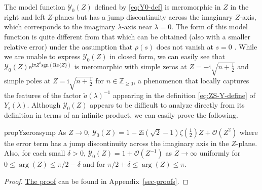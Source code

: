 \documentclass[12pt]{amsart}
\numberwithin{equation}{section}
\newcommand{\ee}{\mathrm{e}}
\newcommand{\ii}{\mathrm{i}}
\newcommand{\SP}{\lambda}
\newcommand{\bigo}[1]{ \mathcal{O}\! \left( #1 \right) }
\begin{document}
The model function $\mathcal{Y}_0(Z)$ defined by \eqref{eq:Y0-def} is meromorphic in $Z$ in the right and left $Z$-planes but has a jump discontinuity across the imaginary $Z$-axis, which corresponds to the imaginary $\SP$-axis near $\SP=0$.  The form of this model function is quite different from that which can be obtained (also with a smaller relative error) under the assumption that $\rho(s)$ does not vanish at $s=0$ \cite[Proposition 4.3]{BaikKMM07}.  While we are unable to express $\mathcal{Y}_0(Z)$ in closed form, we can easily see that 
$\mathcal{Y}_0(Z)\ee^{\ii\pi Z^2\mathrm{sgn}(\mathrm{Re}\{Z\})}$ is meromorphic with simple zeros at $Z=-\ii\sqrt{n+\frac{1}{2}}$ and simple poles at $Z=\ii\sqrt{n+\frac{1}{2}}$ for $n\in\mathbb{Z}_{\ge 0}$, a phenomenon that locally captures the features of the factor $\widetilde{a}(\SP)^{-1}$ appearing in the definition \eqref{eq:ZS-Y-define} of $Y_\epsilon(\SP)$.  Although $\mathcal{Y}_0(Z)$ appears to be difficult to analyze directly from its definition in terms of an infinite product, we can easily prove the following.
\begin{restatable}{prop}{Yzeroasymp}
As $Z\to 0$, $\mathcal{Y}_0(Z)=1-2\ii (\sqrt{2}-1)\zeta(\frac{1}{2})Z +\bigo{Z^2}$ where the error term has a jump discontinuity across the imaginary axis in the $Z$-plane.
Also, for each small $\delta>0$, $\mathcal{Y}_0(Z)=1+\bigo{Z^{-1}}$ as $Z\to\infty$ uniformly for $0\le\arg(Z)\le\pi/2-\delta$ and for $\pi/2+\delta\le\arg(Z)\le\pi$.
\label{prop:Y0-asymp}
\end{restatable}

\begin{proof}
\hyperlink{proof:Yzeroasymp}{The proof} can be found in Appendix~\ref{sec-proofs}. 
\end{proof} 
\end{document}
